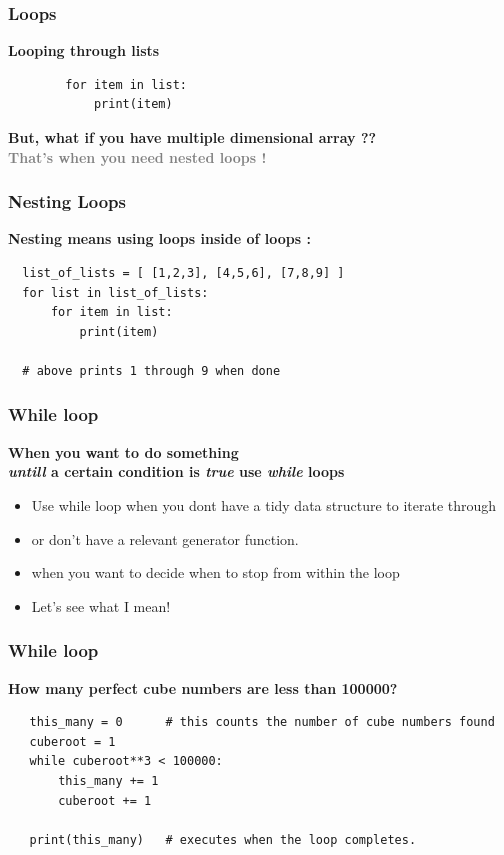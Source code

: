 \documentclass[12pt, aspectratio=169]{beamer}
\begin{document}
\begin{frame}[fragile]
  \frametitle{Loops}
 \textbf{Looping through lists} 
\begin{verbatim}
        for item in list:
            print(item)
\end{verbatim}
 \vspace{4em}
 \pause
\textbf{But, what if you have multiple dimensional array ??\\ }
 \pause
 \vspace{2em}
\textcolor{gray}{\textbf{That's when you need nested loops !}}
 \end{frame}


\begin{frame}[fragile]
  \frametitle{Nesting Loops}
 \textbf{Nesting means using loops inside of loops : } 
 \vspace{2em}
\begin{verbatim}
  list_of_lists = [ [1,2,3], [4,5,6], [7,8,9] ] 
  for list in list_of_lists:
      for item in list:
          print(item)

  # above prints 1 through 9 when done

\end{verbatim}
 \end{frame}
 
 \begin{frame}
   \frametitle{While loop}
   \textbf{When you want to do something \\ 
     \textit{untill} a certain condition is
  \textit{true} use \textit{while} loops}
  \vspace{2em}
   \begin{itemize}
   \item Use while loop when you dont have a tidy data structure to iterate through
   \item or don't have a relevant generator function.
   \item when you want to decide when to stop from within the loop \pause
   \item  Let's see what I mean!
   \end{itemize}
  \vspace{4em}
 \end{frame}


 \begin{frame}[fragile]
   \frametitle{While loop}
   \textbf{ How many perfect cube numbers are less than 100000?}
   \vspace{2em} \pause
\begin{verbatim}
   this_many = 0      # this counts the number of cube numbers found 
   cuberoot = 1
   while cuberoot**3 < 100000:
       this_many += 1
       cuberoot += 1

   print(this_many)   # executes when the loop completes.
\end{verbatim}
 \end{frame}
\end{document}
